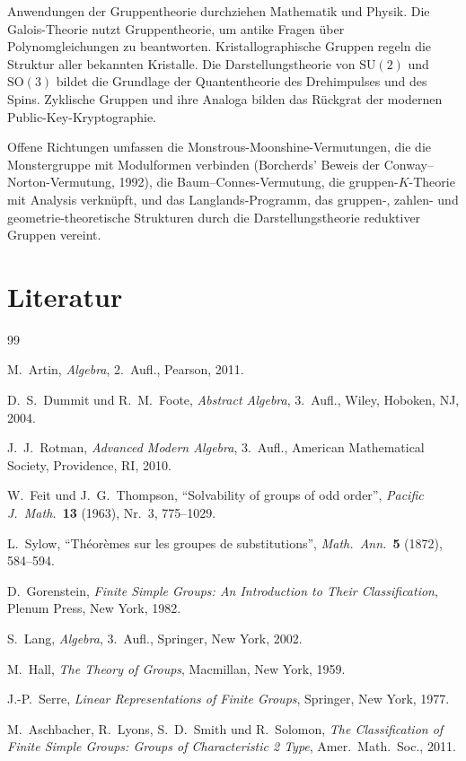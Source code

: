 \documentclass[12pt,a4paper]{amsart}
\theoremstyle{definition}
\begin{document}
Anwendungen der Gruppentheorie durchziehen Mathematik und Physik. Die Galois-Theorie
nutzt Gruppentheorie, um antike Fragen über Polynomgleichungen zu beantworten.
Kristallographische Gruppen regeln die Struktur aller bekannten Kristalle. Die
Darstellungstheorie von $\mathrm{SU}(2)$ und $\mathrm{SO}(3)$ bildet die Grundlage der
Quantentheorie des Drehimpulses und des Spins. Zyklische Gruppen und ihre Analoga bilden
das Rückgrat der modernen Public-Key-Kryptographie.

Offene Richtungen umfassen die Monstrous-Moonshine-Vermutungen, die die Monstergruppe mit
Modulformen verbinden (Borcherds' Beweis der Conway--Norton-Vermutung, 1992), die
Baum--Connes-Vermutung, die gruppen-$K$-Theorie mit Analysis verknüpft, und das
Langlands-Programm, das gruppen-, zahlen- und geometrie-theoretische Strukturen durch
die Darstellungstheorie reduktiver Gruppen vereint.

\section*{Literatur}

\begin{thebibliography}{99}

M.~Artin, \emph{Algebra}, 2.~Aufl., Pearson, 2011.

D.~S.~Dummit und R.~M.~Foote, \emph{Abstract Algebra}, 3.~Aufl.,
Wiley, Hoboken, NJ, 2004.

J.~J.~Rotman, \emph{Advanced Modern Algebra}, 3.~Aufl., American Mathematical
Society, Providence, RI, 2010.

W.~Feit und J.~G.~Thompson, ``Solvability of groups of odd order'',
\emph{Pacific J.\ Math.}\ \textbf{13} (1963), Nr.~3, 775--1029.

L.~Sylow, ``Théorèmes sur les groupes de substitutions'',
\emph{Math.\ Ann.}\ \textbf{5} (1872), 584--594.

D.~Gorenstein, \emph{Finite Simple Groups: An Introduction to Their
Classification}, Plenum Press, New York, 1982.

S.~Lang, \emph{Algebra}, 3.~Aufl., Springer, New York, 2002.

M.~Hall, \emph{The Theory of Groups}, Macmillan, New York, 1959.

J.-P.~Serre, \emph{Linear Representations of Finite Groups}, Springer,
New York, 1977.

M.~Aschbacher, R.~Lyons, S.~D.~Smith und R.~Solomon,
\emph{The Classification of Finite Simple Groups: Groups of Characteristic 2 Type},
Amer.\ Math.\ Soc., 2011.

\end{thebibliography}
\end{document}

